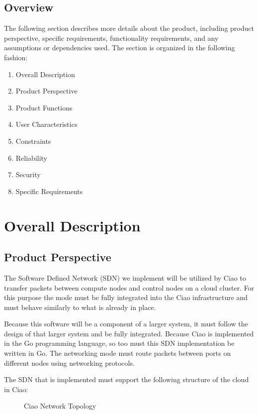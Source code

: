 \documentclass[10pt,letterpaper,onecolumn,draftclsnofoot]{IEEEtran}
\begin{document}



\subsection{Overview}
The following section describes more details about the product, including 
product perspective, specific requirements, functionality requirements, and any
assumptions or dependencies used. The section is organized in the following
fashion:
\begin{enumerate}
	\item Overall Description
	\item Product Perspective
	\item Product Functions
	\item User Characteristics
	\item Constraints
	\item Reliability
	\item Security
	\item Specific Requirements
\end{enumerate}

\section{Overall Description}

\subsection{Product Perspective}

The Software Defined Network (SDN) we implement will be utilized by Ciao to transfer packets between
compute nodes and control nodes on a cloud cluster. For this purpose the mode
must be fully integrated into the Ciao infrastructure and must behave similarly
to what is already in place.

Because this software will be a component of a larger system, it must follow the
design of that larger system and be fully integrated. Because Ciao is
implemented in the Go programming language, so too must this SDN implementation
be written in Go. The networking mode must route packets between ports on
different nodes using networking protocols.

The SDN that is implemented must support the following structure of the cloud in
Ciao:

\begin{figure}[H]
	\caption{Ciao Network Topology~\cite{ciaoNetTopology}}
	\begin{center}
	\end{center}
\end{figure}
\end{document}
